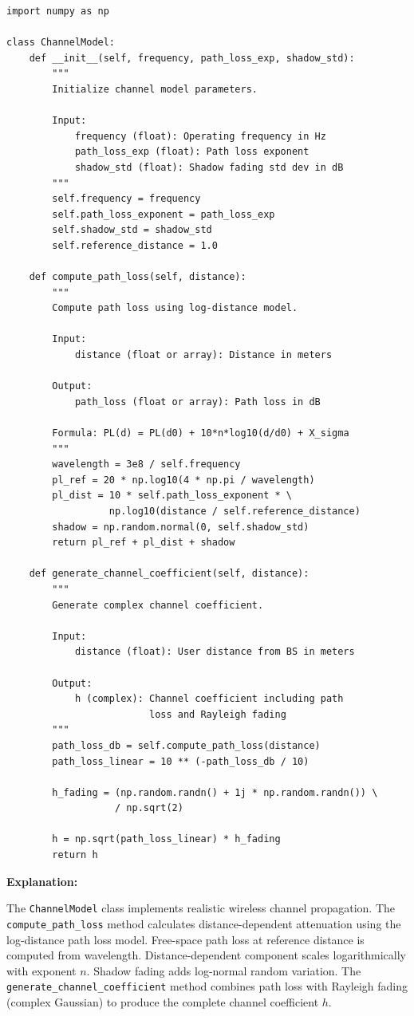 \documentclass[12pt,a4paper]{article}
\begin{document}
\begin{verbatim}
import numpy as np

class ChannelModel:
    def __init__(self, frequency, path_loss_exp, shadow_std):
        """
        Initialize channel model parameters.
        
        Input:
            frequency (float): Operating frequency in Hz
            path_loss_exp (float): Path loss exponent
            shadow_std (float): Shadow fading std dev in dB
        """
        self.frequency = frequency
        self.path_loss_exponent = path_loss_exp
        self.shadow_std = shadow_std
        self.reference_distance = 1.0
    
    def compute_path_loss(self, distance):
        """
        Compute path loss using log-distance model.
        
        Input:
            distance (float or array): Distance in meters
        
        Output:
            path_loss (float or array): Path loss in dB
        
        Formula: PL(d) = PL(d0) + 10*n*log10(d/d0) + X_sigma
        """
        wavelength = 3e8 / self.frequency
        pl_ref = 20 * np.log10(4 * np.pi / wavelength)
        pl_dist = 10 * self.path_loss_exponent * \
                  np.log10(distance / self.reference_distance)
        shadow = np.random.normal(0, self.shadow_std)
        return pl_ref + pl_dist + shadow
    
    def generate_channel_coefficient(self, distance):
        """
        Generate complex channel coefficient.
        
        Input:
            distance (float): User distance from BS in meters
        
        Output:
            h (complex): Channel coefficient including path 
                         loss and Rayleigh fading
        """
        path_loss_db = self.compute_path_loss(distance)
        path_loss_linear = 10 ** (-path_loss_db / 10)
        
        h_fading = (np.random.randn() + 1j * np.random.randn()) \
                   / np.sqrt(2)
        
        h = np.sqrt(path_loss_linear) * h_fading
        return h
\end{verbatim}

\textbf{Explanation:}

The \texttt{ChannelModel} class implements realistic wireless channel propagation. The \texttt{compute\_path\_loss} method calculates distance-dependent attenuation using the log-distance path loss model. Free-space path loss at reference distance is computed from wavelength. Distance-dependent component scales logarithmically with exponent $n$. Shadow fading adds log-normal random variation. The \texttt{generate\_channel\_coefficient} method combines path loss with Rayleigh fading (complex Gaussian) to produce the complete channel coefficient $h$.
\end{document}
